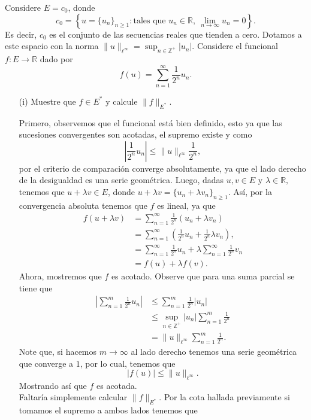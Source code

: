 
Considere $E = c_0$, donde
\[
c_0 = \left\{ u = \{u_n\}_{n \geq 1} :\text{tales que } u_n \in \mathbb{R}, \ \lim_{n \to \infty} u_n = 0 \right\}.
\]
Es decir, $c_0$ es el conjunto de las secuencias reales que tienden a cero. Dotamos a este espacio con la norma
$
\|u\|_{\ell^\infty} = \sup_{n \in \mathbb{Z}^+} |u_n|.
$
Considere el funcional $f : E \to \mathbb{R}$ dado por
\[
f(u) = \sum_{n=1}^{\infty} \frac{1}{2^n} u_n.
\]

\begin{enumerate}
    \item[(i)] Muestre que $f \in E^*$ y calcule $\|f\|_{E^*}$.
    \begin{sols}
    Primero, observemos que el funcional está bien definido, esto ya que  las sucesiones convergentes son acotadas, el supremo existe y como
    $$\left|\frac{1}{2^n}u_n\right|\leq\|u\|_{\ell^\infty}\frac{1}{2^n},$$ 
    por el criterio de comparación converge absolutamente, ya que el lado derecho de la desigualdad es una serie geométrica. Luego, dadas $u,v\in E$ y $\lambda\in\mathbb{R},$ tenemos que $u+\lambda v\in E$, donde $u+\lambda v=\{u_n+\lambda v_n\}_{n\geq 1}.$ Así, por la convergencia absoluta tenemos que $f$ es lineal, ya que
    \begin{align*}
       f(u+\lambda v)&=\sum_{n=1}^\infty\frac{1}{2^n}(u_n+\lambda v_n)\\
       &=\sum_{n=1}^\infty\left(\frac{1}{2^n}u_n+\frac{1}{2^n}\lambda v_n\right),\\
       &=\sum_{n=1}^\infty\frac{1}{2^n}u_n+\lambda\sum_{n=1}^\infty\frac{1}{2^n} v_n\\
       &=f(u)+\lambda f(v)
    .\end{align*}
        Ahora, mostremos que $f$ es acotado. Observe que para una suma parcial se tiene que
        \begin{align*}
            \left|\sum_{n=1}^m\frac{1}{2^n}u_n\right|&\leq\sum_{n=1}^m\frac{1}{2^n}|u_n|\\
            &\leq \sup_{n\in\mathbb{Z}^+}|u_n|\sum_{n=1}^m\frac{1}{2^n}\\
            &=\|u\|_{\ell^\infty}\sum_{n=1}^m\frac{1}{2^n}
        .\end{align*}
    Note que, si hacemos $m\to\infty$ al lado derecho tenemos una serie geométrica que converge a $1$, por lo cual, tenemos que
    $$|f(u)|\leq \|u\|_{\ell^\infty}.$$
    Mostrando así que $f$ es acotada.\\
    Faltaría simplemente calcular $\|f\|_{E^*}.$ Por la cota hallada previamente si tomamos el supremo a ambos lados tenemos que

\end{sols}
\end{enumerate}
